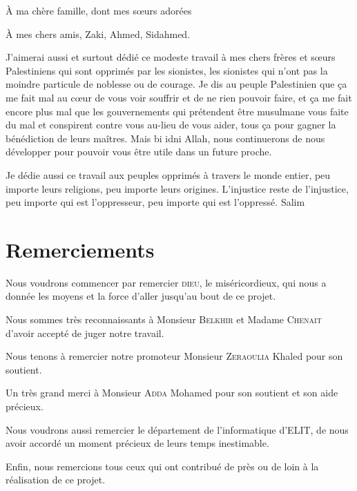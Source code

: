 À ma chère famille, dont mes sœurs  adorées

À mes chers amis, Zaki, Ahmed, Sidahmed.

J'aimerai aussi et surtout dédié ce modeste travail à mes chers frères et sœurs Palestiniens qui sont opprimés par les
sionistes, les sionistes qui n'ont pas la moindre particule de noblesse ou de courage. Je dis au peuple Palestinien
que ça me fait mal au cœur de vous voir souffrir et de ne rien pouvoir faire, et ça me fait encore plus mal que 
les gouvernements qui prétendent être musulmane vous faite du mal et conspirent contre vous au-lieu de vous aider, tous 
ça pour gagner la bénédiction de leurs maîtres. 
Mais bi idni Allah, nous continuerons de nous développer pour pouvoir vous être utile dans un future proche.

Je dédie aussi ce travail aux peuples opprimés à travers le monde entier, peu importe leurs religions, peu importe
leurs origines. L'injustice reste de l'injustice, peu importe qui est l'oppresseur, peu importe qui est l'oppressé.
\vfill
Salim
\vfill

\chapter*{Remerciements}
Nous voudrons commencer par remercier \textsc{dieu}, le miséricordieux, qui nous a donnée les moyens et la force
d'aller jusqu'au bout de ce projet.

Nous sommes très reconnaissants à Monsieur \textsc{Belkhir} et Madame \textsc{Chenait} d'avoir accepté de juger notre travail.

Nous tenons à remercier notre promoteur Monsieur \textsc{Zeraoulia} Khaled pour son soutient.

Un très grand merci à Monsieur \textsc{Adda} Mohamed pour son soutient et son aide précieux.

Nous voudrons aussi remercier le département de l'informatique d'ELIT, de nous avoir accordé un moment précieux de
leurs temps inestimable.

Enfin, nous remercions tous ceux qui ont contribué de près ou de loin à la réalisation de ce projet.
